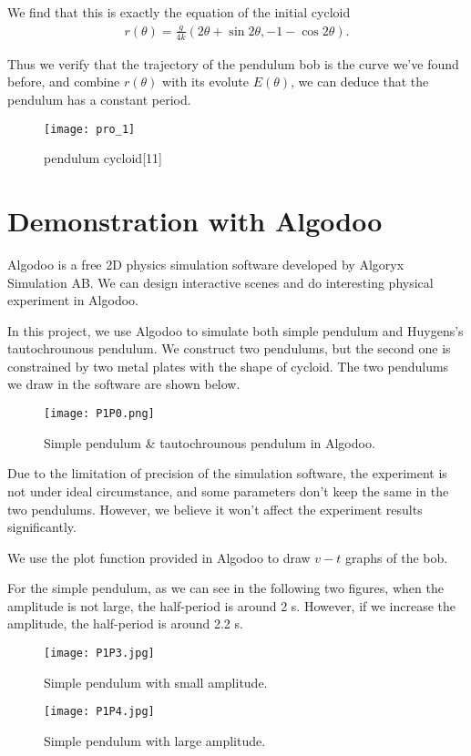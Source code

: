 \documentclass{article}
\begin{document}
	We find that this is exactly the equation of the initial cycloid 
	\begin{equation*}
		\begin{aligned}
			r(\theta)=\frac{g}{4k}(2\theta+\sin2\theta,-1-\cos2\theta).
		\end{aligned}
	\end{equation*}

	Thus we verify that the trajectory of the pendulum bob is the curve we've found before, and combine $r(\theta)$ with its evolute $E(\theta)$, we can deduce that the pendulum has a constant period.
	
 \begin{figure}[H]
  \centering
  \texttt{[image: pro\_1]}
  \caption{pendulum cycloid[11]}
\end{figure}
\section{Demonstration with Algodoo}
	Algodoo is a free 2D physics simulation software developed by Algoryx Simulation AB. We can design interactive scenes and do interesting physical experiment in Algodoo.
	\par In this project, we use Algodoo to simulate both simple pendulum and Huygens’s tautochrounous pendulum. We construct two pendulums, but the second one is constrained by two metal plates with the shape of cycloid. The two pendulums we draw in the software are shown below.
\begin{figure}[H]
\centering
\texttt{[image: P1P0.png]}
\caption{Simple pendulum \& tautochrounous pendulum in Algodoo.}
\label{g0}
\end{figure}
	\par Due to the limitation of precision of the simulation software, the experiment is not under ideal circumstance, and some parameters don't keep the same in the two pendulums. However, we believe it won't affect the experiment results significantly.
	\par We use the plot function provided in Algodoo to draw $v-t$ graphs of the bob.
	\par For the simple pendulum, as we can see in the following two figures, when the amplitude is not large, the half-period is around 2 s. However, if we increase the amplitude, the half-period is around 2.2 s.
\begin{figure}[H]
\centering
\texttt{[image: P1P3.jpg]}
\caption{Simple pendulum with small amplitude.}
\label{g3}
\end{figure}
\begin{figure}[H]
\centering
\texttt{[image: P1P4.jpg]}
\caption{Simple pendulum with large amplitude.}
\label{g4}
\end{figure}
\end{document}
